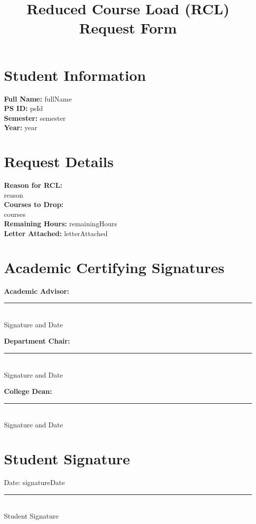 \documentclass[12pt]{article}
\title{\textbf{Reduced Course Load (RCL) Request Form}}
\author{}
\date{}
\begin{document}
\maketitle

\section*{Student Information}
\textbf{Full Name:} {{fullName}} \\[0.5em]
\textbf{PS ID:} {{psId}} \\[0.5em]
\textbf{Semester:} {{semester}} \\[0.5em]
\textbf{Year:} {{year}} \\[0.5em]

\section*{Request Details}
\textbf{Reason for RCL:} \\[0.5em]
{{reason}} \\[0.5em]

\textbf{Courses to Drop:} \\[0.5em]
{{courses}} \\[0.5em]

\textbf{Remaining Hours:} {{remainingHours}} \\[0.5em]

\textbf{Letter Attached:} {{letterAttached}} \\[0.5em]

\section*{Academic Certifying Signatures}
\textbf{Academic Advisor:} \\[2em]
\rule{6cm}{0.4pt} \\
Signature and Date

\textbf{Department Chair:} \\[2em]
\rule{6cm}{0.4pt} \\
Signature and Date

\textbf{College Dean:} \\[2em]
\rule{6cm}{0.4pt} \\
Signature and Date

\vspace{2em}
\section*{Student Signature}
Date: {{signatureDate}} \\[2em]
\rule{6cm}{0.4pt} \\
Student Signature
\end{document}
